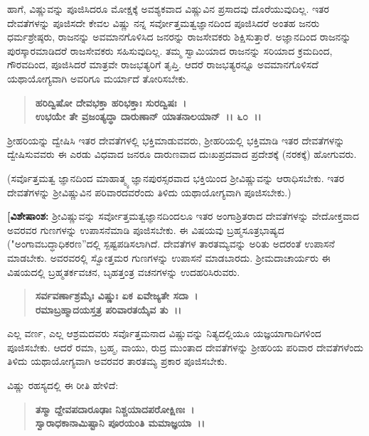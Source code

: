 ಹಾಗೆ, ವಿಷ್ಣುವನ್ನು ಪೂಜಿಸಿದರೂ ಮೋಕ್ಷಕ್ಕೆ ಅವಶ್ಯಕವಾದ ವಿಷ್ಣುವಿನ ಪ್ರಸಾದವು ದೊರೆಯುವುದಿಲ್ಲ. ಇತರ ದೇವತೆಗಳನ್ನು ಪೂಜಿಸದೇ ಕೇವಲ ವಿಷ್ಣು ನನ್ನ ಸರ್ವೋತ್ತಮತ್ವ\-ಜ್ಞಾನದಿಂದ ಪೂಜಿಸಿದರೆ ಅಂತಹ ಜನರು ಧರ್ಮಶ್ರೇಷ್ಠರು, ರಾಜನನ್ನು ಅವಮಾನಗೊಳಿಸಿದ ಜನರನ್ನು ರಾಜಸೇವಕರು ಶಿಕ್ಷಿಸುತ್ತಾರೆ. ಅಜ್ಞಾನದಿಂದ ರಾಜನನ್ನು ಪುರಸ್ಕಾರಮಾಡಿದರೆ ರಾಜಸೇವಕರು ಸಹಿಸುವುದಿಲ್ಲ. ತಮ್ಮ ಸ್ವಾಮಿಯಾದ ರಾಜನನ್ನು ಸರಿಯಾದ ಕ್ರಮದಿಂದ, ಗೌರವದಿಂದ, ಪೂಜಿಸಿದರೆ ಮಾತ್ರವೇ ರಾಜಭತ್ಯರಿಗೆ ತೃಪ್ತಿ. ಆದರೆ ರಾಜಭತ್ಯರನ್ನೂ ಅವಮಾನಗೊಳಿಸದೆ ಯಥಾಯೋಗ್ಯವಾಗಿ ಅವರಿಗೂ ಮರ್ಯಾದೆ ತೋರಿಸಬೇಕು.

\begin{verse}
\textbf{ಹರಿದ್ವಿಷೋ ದೇವಭಕ್ತಾ ಹರಿಭಕ್ತಾಃ ಸುರದ್ವಿಷಃ~।}\\\textbf{ಉಭಯೇ ತೇ ವ್ರಜಂತ್ಯದ್ಧಾ ದಾರುಣಾನ್ ಯಾತನಾಲಯಾನ್~।। ೬೦~।।}
\end{verse}

ಶ‍್ರೀಹರಿಯನ್ನು ದ್ವೇಷಿಸಿ ಇತರ ದೇವತೆಗಳಲ್ಲಿ ಭಕ್ತಿಮಾಡುವವರು, ಶ‍್ರೀಹರಿಯಲ್ಲಿ ಭಕ್ತಿಮಾಡಿ ಇತರ ದೇವತೆಗಳನ್ನು ದ್ವೇಷಿಸುವವರು ಈ ಎರಡು ವಿಧವಾದ ಜನರೂ ದಾರುಣವಾದ ದುಃಖಪ್ರದವಾದ ಪ್ರದೇಶಕ್ಕೆ (ನರಕಕ್ಕೆ) ಹೋಗುವರು.

(ಸರ್ವೊತ್ತಮತ್ವ ಜ್ಞಾನದಿಂದ ಮಾಹಾತ್ಮ್ಯ ಜ್ಞಾನಪುರಸ್ಸರವಾದ ಭಕ್ತಿಯಿಂದ ಶ‍್ರೀವಿಷ್ಣುವನ್ನು ಆರಾಧಿಸಬೇಕು. ಇತರ ದೇವತೆಗಳನ್ನು ಶ‍್ರೀವಿಷ್ಣುವಿನ ಪರಿವಾರದವರೆಂದು ತಿಳಿದು ಯಥಾಯೋಗ್ಯವಾಗಿ ಪೂಜಿಸಬೇಕು.)

\textbf{[ವಿಶೇಷಾಂಶ:} ಶ‍್ರೀವಿಷ್ಣುವನ್ನು ಸರ್ವೋತ್ತಮತ್ವಜ್ಞಾನದಿಂದಲೂ ಇತರ ಅಂಗಾಶ್ರಿತರಾದ ದೇವತೆಗಳನ್ನು ವೇದೋಕ್ತವಾದ ಅವರವರ ಗುಣಗಳನ್ನು ಉಪಾಸನೆಮಾಡಿ ಪೂಜಿಸಬೇಕು. ಈ ವಿಷಯವು ಬ್ರಹ್ಮಸೂತ್ರಭಾಷ್ಯದ ("ಅಂಗಾವಬದ್ಧಾಧಿಕರಣ”ದಲ್ಲಿ ಸ್ಪಷ್ಟಪಡಿಸಲಾಗಿದೆ. ದೇವತೆ\-ಗಳ ತಾರತಮ್ಯವನ್ನು ಅರಿತು ಅದರಂತೆ ಉಪಾಸನೆ ಮಾಡಬೇಕು. ಅವರವರಲ್ಲಿ ಸ್ವೋತ್ತಮರ ಗುಣಗಳನ್ನು ಉಪಾಸನೆ ಮಾಡಬಾರದು. ಶ‍್ರೀಮದಾಚಾರ್ಯರು ಈ ವಿಷಯ\-ದಲ್ಲಿ ಬ್ರಹ್ಮತರ್ಕವಚನ, ಬೃಹತ್ತಂತ್ರ ವಚನಗಳನ್ನು ಉದಹರಿಸಿರುವರು.

\begin{verse}
\textbf{ಸರ್ವವರ್ಣಾಶ್ರಮೈಃ ವಿಷ್ಣುಃ ಏಕ ಏವೇಜ್ಯತೇ ಸದಾ~।}\\\textbf{ರಮಾಬ್ರಹ್ಮಾದಯಸ್ತತ್ರ ಪರಿವಾರತಯೈವ ತು~।।} 
\end{verse}

ಎಲ್ಲ ವರ್ಣ, ಎಲ್ಲ ಆಶ್ರಮದವರು ಸರ್ವೊತ್ತಮನಾದ ವಿಷ್ಣುವನ್ನು ನಿತ್ಯದಲ್ಲಿಯೂ ಯಜ್ಞಯಾಗಾದಿಗಳಿಂದ ಪೂಜಿಸಬೇಕು. ಆದರೆ ರಮಾ, ಬ್ರಹ್ಮ, ವಾಯು, ರುದ್ರ ಮುಂತಾದ ದೇವತೆ\-ಗಳನ್ನು ಶ‍್ರೀಹರಿಯ ಪರಿವಾರ ದೇವತೆಗಳೆಂದು ತಿಳಿದು ಯಥಾಯೋಗ್ಯವಾಗಿ ಅವರವರ ತಾರತಮ್ಯ ಪ್ರಕಾರ ಪೂಜಿಸಬೇಕು.

\begin{flushleft}
ವಿಷ್ಣು ರಹಸ್ಯದಲ್ಲಿ ಈ ರೀತಿ ಹೇಳಿದೆ: 
\end{flushleft}

\begin{verse}
\textbf{ತಸ್ಮಾ ದ್ದೇವಪದಾರೂಢಾಃ ನಿಶ್ಚಯಾದಪರೋಕ್ಷಿಣಃ~।}\\\textbf{ಸ್ವಾರಾಧಕಾನಾಮಿಷ್ಟಾನಿ ಪೂರಯಂತಿ ಮಮಾಜ್ಞಯಾ~।। }
\end{verse}

